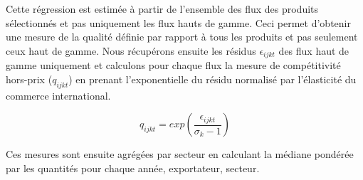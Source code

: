 \documentclass[french,10pt,a4paper]{article}
\begin{document}
\bigskip

Cette régression est estimée à partir de l'ensemble des flux des produits sélectionnés et pas uniquement les flux hauts de gamme. Ceci permet d'obtenir une mesure de la qualité définie par rapport à tous les produits et pas seulement ceux haut de gamme. Nous récupérons ensuite les résidus $\epsilon_{ijkt}$ des flux haut de gamme uniquement et calculons pour chaque flux la mesure de compétitivité hors-prix ($q_{ijkt}$) en prenant l'exponentielle du résidu normalisé par l'élasticité du commerce international. 

\begin{equation}
\label{eq:3}
q_{ijkt} = exp \left( \frac{\epsilon_{ijkt}}{\sigma_k - 1} \right)
\end{equation}

Ces mesures sont ensuite agrégées par secteur en calculant la médiane pondérée par les quantités pour chaque année, exportateur, secteur. 






\newpage

% 


\end{document}
